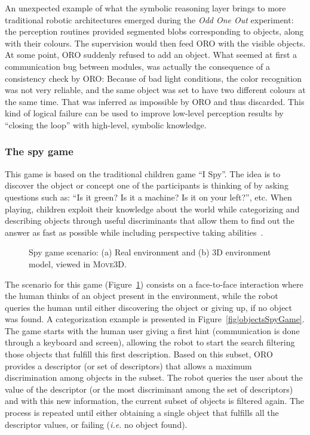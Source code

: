 An unexpected example of what the symbolic reasoning layer brings to more
traditional robotic architectures emerged during the \emph{Odd One Out}
experiment: the perception routines provided segmented blobs corresponding to
objects, along with their colours. The supervision would then feed ORO with the
visible objects. At some point, ORO suddenly refused to add an object. What
seemed at first a communication bug between modules, was actually the
consequence of a consistency check by ORO: Because of bad light conditions, the
color recognition was not very reliable, and the same object was set to have
two different colours at the same time. That was inferred as impossible by ORO
and thus discarded. This kind of logical failure can be used to improve
low-level perception results by ``closing the loop'' with high-level, symbolic
knowledge.


\subsubsection{The spy game}
\label{spygame}

This game is based on the traditional children game ``I Spy''. The idea is to
discover the object or concept one of the participants is thinking of by asking
questions such as: ``Is it green? Is it a machine? Is it on your left?'', etc.
When playing, children exploit their knowledge about the world while
categorizing and describing objects through useful discriminants that allow
them to find out the answer as fast as possible while including perspective
taking abilities~\cite{Moll2006}.

\begin{figure}
\centering

\caption{Spy game scenario: (a) Real environment and (b) 3D environment model, viewed in \textsc{Move3D}.}
\label{fig|spyGameScenario}
\end{figure}

The scenario for this game (Figure~\ref{fig|spyGameScenario}) consists on a
face-to-face interaction where the human thinks of an object present in the
environment, while the robot queries the human until either discovering the
object or giving up, if no object was found. A categorization example is
presented in Figure~\ref{fig|objectsSpyGame}. The game starts with the human
user giving a first hint (communication is done through a keyboard and screen),
allowing the robot to start the search filtering those objects that fulfill
this first description. Based on this subset, ORO provides a descriptor (or set
of descriptors) that allows a maximum discrimination among objects in the
subset. The robot queries the user about the value of the descriptor (or the
most discriminant among the set of descriptors) and with this new information,
the current subset of objects is filtered again. The process is repeated until
either obtaining a single object that fulfills all the descriptor values, or
failing (\textit{i.e.} no object found). 

